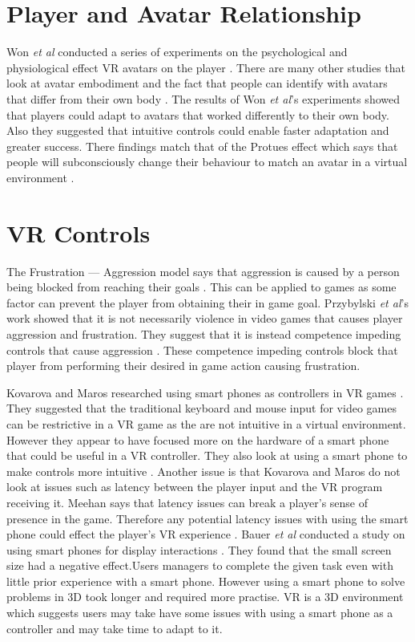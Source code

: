 \documentclass{scrartcl}
\begin{document}
\section{Player and Avatar Relationship}
Won \textit{et al} conducted a series of experiments on the psychological and physiological effect VR avatars on the player \cite{won2015homuncular}. There are many other studies that look at  avatar embodiment and the fact that people can identify with avatars that differ from their own body \cite{Groen, Latoschik}. The results of Won \textit{et al}'s experiments showed that players could adapt to avatars that worked differently to their own body. Also they suggested that intuitive controls could enable faster adaptation and greater success. There findings match that of the Protues effect which says that people will subconsciously change their behaviour to match an avatar in a virtual environment \cite{won2015homuncular, yee2007proteus}.


\section{VR Controls}
The Frustration --- Aggression model says that aggression is caused by a person being blocked from reaching their goals \cite{dollard1939frustration}.  This can be applied to games as some factor can prevent the player from obtaining their in game goal.  Przybylski \textit{et al}'s work showed that it is not necessarily violence in video games that causes player aggression and frustration. They suggest that it is instead competence impeding controls that cause aggression \cite{przybylski, przybylski2010motivational}. These competence impeding controls block that player from performing their desired in game action causing frustration. 


Kovarova and Maros researched using smart phones as controllers in VR games \cite{Kovarova}. They suggested that the traditional keyboard and mouse input for video games can be restrictive in a VR game as the are not intuitive in a virtual environment. However they appear to have focused more on the hardware of a smart phone that could be useful in a VR controller. They also look at using a smart phone to make controls more intuitive \cite{Kovarova}.
Another issue is that Kovarova and Maros do not look at issues such as latency between the player input and the VR program receiving it.  Meehan says that latency issues can break a player's sense of presence in the game. Therefore any potential latency issues with using the smart phone could effect the player's VR experience \cite{Meehan}.
Bauer \textit{et al} conducted a study on using smart phones for display interactions \cite{Bauer}. They found that the small screen size had a negative effect.Users managers to complete the given task even with little prior experience with a smart phone. However using a smart phone to solve problems in 3D took longer and required more practise. VR is a 3D environment which suggests users may take have some issues with using a smart phone as a controller and may take time to adapt to it. 
\end{document}

